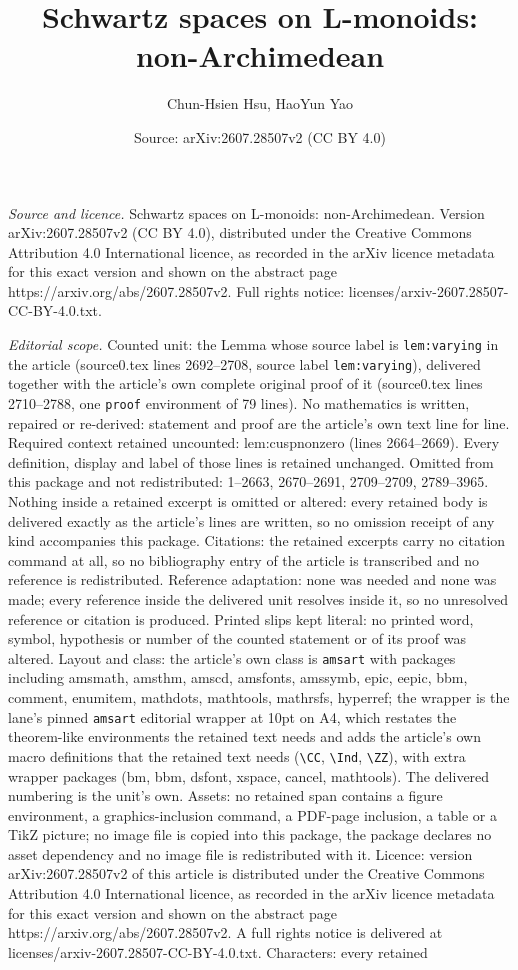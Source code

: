 \documentclass[10pt,a4paper]{amsart}
\title[Schwartz spaces on L-monoids: non-Archimedean]{Schwartz spaces on L-monoids: non-Archimedean}
\author{Chun-Hsien Hsu, HaoYun Yao}
\date{Source: arXiv:2607.28507v2 (CC BY 4.0)}
\begin{document}
\maketitle

\noindent\emph{Source and licence.} Schwartz spaces on L-monoids: non-Archimedean. Version arXiv:2607.28507v2 (CC BY 4.0), distributed under the Creative Commons Attribution 4.0 International licence, as recorded in the arXiv licence metadata for this exact version and shown on the abstract page https://arxiv.org/abs/2607.28507v2. Full rights notice: licenses/arxiv-2607.28507-CC-BY-4.0.txt.\par\smallskip

\noindent\textit{Editorial scope.} Counted unit: the Lemma whose source label is \texttt{lem:varying} in the article (source0.tex lines 2692--2708, source label \texttt{lem:varying}), delivered together with the article's own complete original proof of it (source0.tex lines 2710--2788, one \texttt{proof} environment of 79 lines). No mathematics is written, repaired or re-derived: statement and proof are the article's own text line for line. Required context retained uncounted: lem:cuspnonzero (lines 2664--2669). Every definition, display and label of those lines is retained unchanged. Omitted from this package and not redistributed: 1--2663, 2670--2691, 2709--2709, 2789--3965. Nothing inside a retained excerpt is omitted or altered: every retained body is delivered exactly as the article's lines are written, so no omission receipt of any kind accompanies this package. Citations: the retained excerpts carry no citation command at all, so no bibliography entry of the article is transcribed and no reference is redistributed. Reference adaptation: none was needed and none was made; every reference inside the delivered unit resolves inside it, so no unresolved reference or citation is produced. Printed slips kept literal: no printed word, symbol, hypothesis or number of the counted statement or of its proof was altered. Layout and class: the article's own class is \texttt{amsart} with packages including amsmath, amsthm, amscd, amsfonts, amssymb, epic, eepic, bbm, comment, enumitem, mathdots, mathtools, mathrsfs, hyperref; the wrapper is the lane's pinned \texttt{amsart} editorial wrapper at 10pt on A4, which restates the theorem-like environments the retained text needs and adds the article's own macro definitions that the retained text needs (\texttt{\textbackslash CC}, \texttt{\textbackslash Ind}, \texttt{\textbackslash ZZ}), with extra wrapper packages (bm, bbm, dsfont, xspace, cancel, mathtools). The delivered numbering is the unit's own. Assets: no retained span contains a figure environment, a graphics-inclusion command, a PDF-page inclusion, a table or a TikZ picture; no image file is copied into this package, the package declares no asset dependency and no image file is redistributed with it. Licence: version arXiv:2607.28507v2 of this article is distributed under the Creative Commons Attribution 4.0 International licence, as recorded in the arXiv licence metadata for this exact version and shown on the abstract page https://arxiv.org/abs/2607.28507v2. A full rights notice is delivered at licenses/arxiv-2607.28507-CC-BY-4.0.txt. Characters: every retained 
\end{document}
